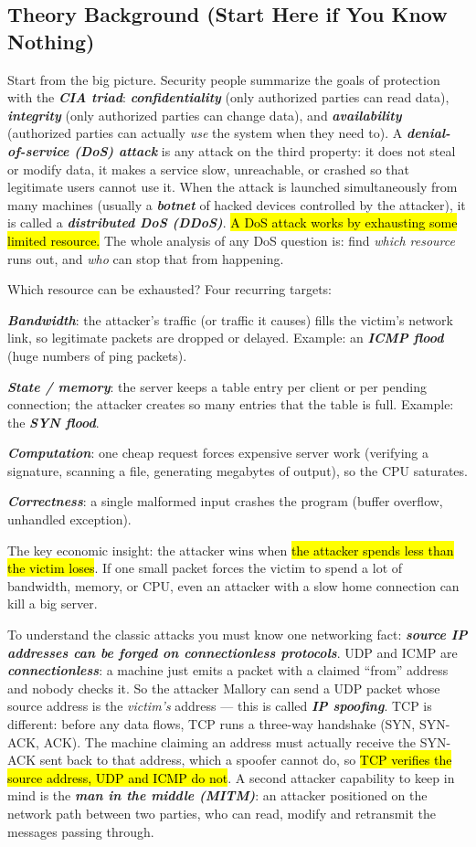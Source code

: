 \documentclass[12pt, a4paper]{article}
\newcommand{\term}[1]{\textbf{\textit{#1}}}        %
\newcommand{\imp}[1]{\hl{#1}}                       %
\begin{document}
\subsection*{Theory Background (Start Here if You Know Nothing)}
Start from the big picture. Security people summarize the goals of protection with the \term{CIA triad}: \term{confidentiality} (only authorized parties can read data), \term{integrity} (only authorized parties can change data), and \term{availability} (authorized parties can actually \emph{use} the system when they need to). A \term{denial-of-service (DoS) attack} is any attack on the third property: it does not steal or modify data, it makes a service slow, unreachable, or crashed so that legitimate users cannot use it. When the attack is launched simultaneously from many machines (usually a \term{botnet} of hacked devices controlled by the attacker), it is called a \term{distributed DoS (DDoS)}. \imp{A DoS attack works by exhausting some limited resource.} The whole analysis of any DoS question is: find \emph{which resource} runs out, and \emph{who} can stop that from happening.

Which resource can be exhausted? Four recurring targets: \begin{tightitem}\item \term{Bandwidth}: the attacker's traffic (or traffic it causes) fills the victim's network link, so legitimate packets are dropped or delayed. Example: an \term{ICMP flood} (huge numbers of ping packets).\item \term{State / memory}: the server keeps a table entry per client or per pending connection; the attacker creates so many entries that the table is full. Example: the \term{SYN flood}.\item \term{Computation}: one cheap request forces expensive server work (verifying a signature, scanning a file, generating megabytes of output), so the CPU saturates.\item \term{Correctness}: a single malformed input crashes the program (buffer overflow, unhandled exception). \end{tightitem} The key economic insight: the attacker wins when \imp{the attacker spends less than the victim loses}. If one small packet forces the victim to spend a lot of bandwidth, memory, or CPU, even an attacker with a slow home connection can kill a big server.

To understand the classic attacks you must know one networking fact: \term{source IP addresses can be forged on connectionless protocols}. UDP and ICMP are \term{connectionless}: a machine just emits a packet with a claimed ``from'' address and nobody checks it. So the attacker Mallory can send a UDP packet whose source address is the \emph{victim's} address --- this is called \term{IP spoofing}. TCP is different: before any data flows, TCP runs a three-way handshake (SYN, SYN-ACK, ACK). The machine claiming an address must actually receive the SYN-ACK sent back to that address, which a spoofer cannot do, so \imp{TCP verifies the source address, UDP and ICMP do not}. A second attacker capability to keep in mind is the \term{man in the middle (MITM)}: an attacker positioned on the network path between two parties, who can read, modify and retransmit the messages passing through.
\end{document}
